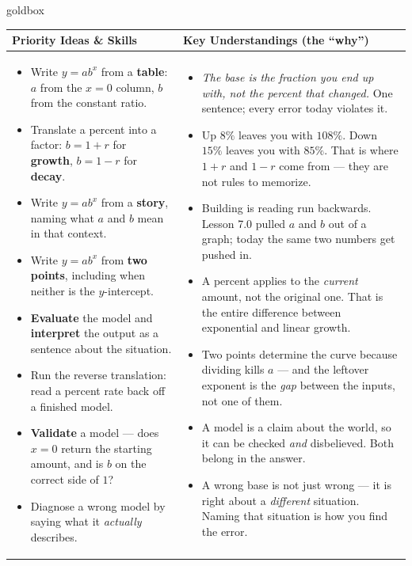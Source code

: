 \documentclass[10pt]{article}
\begin{document}
\renewcommand{\arraystretch}{1.4}
\begin{skillbox}{goldbox}
\begin{tabularx}{\linewidth}{@{}X|X@{}}
\textbf{Priority Ideas \& Skills} & \textbf{Key Understandings (the ``why'')} \\[2pt]
\hline
\vspace{-6pt}
\begin{itemize}[leftmargin=1.1em, nosep, after=\vspace{2pt}]
  \item Write $y=ab^{x}$ from a \textbf{table}: $a$ from the $x=0$ column, $b$ from the constant ratio.
  \item Translate a percent into a factor: $b=1+r$ for \textbf{growth}, $b=1-r$ for \textbf{decay}.
  \item Write $y=ab^{x}$ from a \textbf{story}, naming what $a$ and $b$ mean in that context.
  \item Write $y=ab^{x}$ from \textbf{two points}, including when neither is the $y$-intercept.
  \item \textbf{Evaluate} the model and \textbf{interpret} the output as a sentence about the situation.
  \item Run the reverse translation: read a percent rate back off a finished model.
  \item \textbf{Validate} a model --- does $x=0$ return the starting amount, and is $b$ on the correct side of $1$?
  \item Diagnose a wrong model by saying what it \emph{actually} describes.
\end{itemize}
&
\vspace{-6pt}
\begin{itemize}[leftmargin=1.1em, nosep, after=\vspace{2pt}]
  \item \emph{The base is the fraction you end up with, not the percent that changed.} One sentence; every error today violates it.
  \item Up $8\%$ leaves you with $108\%$. Down $15\%$ leaves you with $85\%$. That is where $1+r$ and $1-r$ come from --- they are not rules to memorize.
  \item Building is reading run backwards. Lesson 7.0 pulled $a$ and $b$ out of a graph; today the same two numbers get pushed in.
  \item A percent applies to the \emph{current} amount, not the original one. That is the entire difference between exponential and linear growth.
  \item Two points determine the curve because dividing kills $a$ --- and the leftover exponent is the \emph{gap} between the inputs, not one of them.
  \item A model is a claim about the world, so it can be checked \emph{and} disbelieved. Both belong in the answer.
  \item A wrong base is not just wrong --- it is right about a \emph{different} situation. Naming that situation is how you find the error.
\end{itemize}
\end{tabularx}
\end{skillbox}
\end{document}
